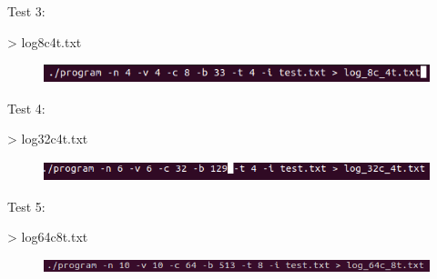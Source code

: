 \documentclass[12pt]{report}
\renewcommand{\_}{\kern-1.5pt\textunderscore\kern-1.5pt}
\begin{document}
\vspace{\baselineskip}\begin{justify}
Test 3:
\end{justify}
\begin{justify}
> log\_8c\_4t.txt
\end{justify}


\begin{figure}[H]
	\begin{Center}
		\includegraphics[width=5.0in,height=0.22in]{image3.png}
	\end{Center}
\end{figure}



\vspace{\baselineskip}
\vspace{\baselineskip}
\begin{justify}
Test 4:
\end{justify}
\begin{justify}
> log\_32c\_4t.txt
\end{justify}


\begin{figure}[H]
	\begin{Center}
		\includegraphics[width=5.0in,height=0.23in]{image4.png}
	\end{Center}
\end{figure}



\vspace{\baselineskip}
\vspace{\baselineskip}
\begin{justify}
Test 5:
\end{justify}
\begin{justify}
> log\_64c\_8t.txt
\end{justify}


\begin{figure}[H]
	\begin{Center}
		\includegraphics[width=5.0in,height=0.16in]{image5.png}
	\end{Center}
\end{figure}
\end{document}
